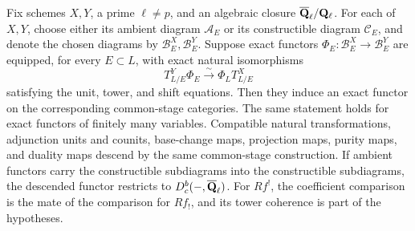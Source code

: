\begin{theorem}
\label{thm:qbar-functor-descent}


Fix schemes \(X,Y\), a prime \(\ell\neq p\), and an algebraic closure
\(\overline{\mathbf Q}_\ell/\mathbf Q_{\ell}\).  For each of \(X,Y\), choose either its ambient diagram
\(\mathcal A_E\) or its constructible diagram \(\mathcal C_E\), and denote
the chosen diagrams by \(\mathcal B_E^X,\mathcal B_E^Y\).  Suppose exact
functors \(\Phi_E:\mathcal B_E^X\to\mathcal B_E^Y\) are
equipped, for every \(E\subset L\), with exact natural isomorphisms
\[
 T^Y_{L/E}\Phi_E\xrightarrow{\sim}\Phi_LT^X_{L/E}
\]
satisfying the unit, tower, and shift equations.  Then they induce an exact
functor on the corresponding common-stage categories.  The same statement
holds for exact functors of finitely many variables.  Compatible natural transformations,
adjunction units and counits, base-change maps, projection maps, purity maps,
and duality maps descend by the same common-stage construction.  If ambient
functors carry the constructible subdiagrams into the
constructible subdiagrams, the descended functor restricts to
\(D^b_c(-,\overline{\mathbf Q}_\ell)\).  For \(Rf^!\), the coefficient comparison is the mate of the comparison for
\(Rf_!\), and its tower coherence is part of the hypotheses.
\end{theorem}

